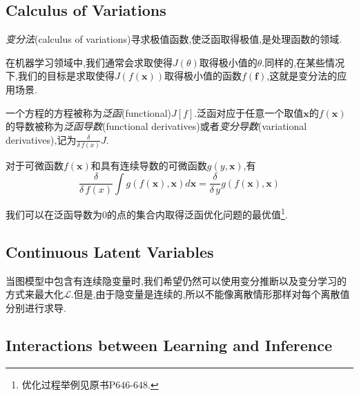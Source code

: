 \subsection{Calculus of Variations}

\textit{变分法}(calculus of variations)寻求极值函数,使泛函取得极值,是处理函数的领域.

在机器学习领域中,我们通常会求取使得$J(\theta)$取得极小值的$\theta$.同样的,在某些情况下,我们的目标是求取使得$J(f(\mathbf x))$取得极小值的函数$f(\mathbf f)$,这就是变分法的应用场景.

一个方程的方程被称为\textit{泛函}(functional)$J[f]$.泛函对应于任意一个取值$\mathbf x$的$f(\mathbf x)$的导数被称为\textit{泛函导数}(functional derivatives)或者\textit{变分导数}(variational derivatives),记为$\frac{\delta}{\delta\,f(x)}J$.

对于可微函数$f(\mathbf x)$和具有连续导数的可微函数$g(y,\mathbf x)$,有
\begin{equation}
\frac{\delta}{\delta\,f(x)}\int g(f(\mathbf x),\mathbf x)d\mathbf x=\frac{\delta}{\delta\,y}g(f(\mathbf x),\mathbf x)
\end{equation}

我们可以在泛函导数为$0$的点的集合内取得泛函优化问题的最优值\footnote{优化过程举例见原书P$646$-$648$.}.

\subsection{Continuous Latent Variables}

当图模型中包含有连续隐变量时,我们希望仍然可以使用变分推断以及变分学习的方式来最大化$\mathcal L$.但是,由于隐变量是连续的,所以不能像离散情形那样对每个离散值分别进行求导.

\subsection{Interactions between Learning and Inference}